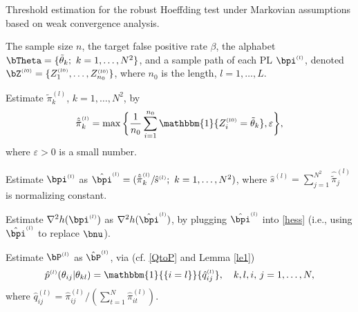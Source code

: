 \documentclass[10pt, twocolumn]{IEEEtran}
\begin{document}
\begin{algorithm}
  \caption{Threshold estimation for the robust Hoeffding test under
    Markovian assumptions based on weak convergence analysis.}
	\label{alg:thresrob1}
\begin{algorithmic}[1]
  \REQUIRE The sample size $n$, the target false positive
  rate $\beta$, the alphabet ${\bTheta} = \{
  {{{\tilde {\theta}}_k}}; ~k = 1, \ldots, N^2 \}$, and a sample path
  of each PL $\bpi^{\scriptscriptstyle{(l)}}$, denoted
  ${\bZ^{\scriptscriptstyle{( l0 )}}} = \{ {Z_1^{\scriptscriptstyle{( l0
        )}}, \ldots, Z_{n_0}^{\scriptscriptstyle{( l0 )}}}\}$, where
  $n_0$ is the length, $l=1,\ldots,L$.  


\STATE \label{line2} Estimate $ {{{\tilde
      {\pi}}_k^{\scriptscriptstyle{(l)}}}}$, $k=1,\ldots,N^2$, by
\[
{{\hat {\tilde {\pi}} }_k^{\scriptscriptstyle{(l)}}} = \max \bigg\{
\frac{1}{n_0} \sum_{i = 1}^{n_0} \mathbbm{1}\{
Z_i^{\scriptscriptstyle{(l0)}} = \tilde{\theta}_k \}, \varepsilon \bigg\},
\]
where $\varepsilon > 0$ is a small number. 

\STATE \label{line3} Estimate ${\bpi}^{\scriptscriptstyle{(l)}}$ as
${\hat{{\bpi}}^{\scriptscriptstyle{(l)}}} = ( {{{{{\hat{ \tilde
            {\pi}}}_k^{\scriptscriptstyle{(l)}}}}} \mathord{/ {\vphantom
      {1 2}} \kern-\nulldelimiterspace} {{\hat
      s^{\scriptscriptstyle{(l)}}}}}; ~k = 1, \ldots, N^2 )$, where
$\hat s^{\scriptscriptstyle{(l)}} = \sum\nolimits_{j = 1}^{{N^2}}
{{{\hat {\tilde{ \pi }}}_j^{\scriptscriptstyle{(l)}}}} $ is normalizing
constant.

\STATE Estimate ${\nabla^2}h( {\bpi}^{\scriptscriptstyle{(l)}} )$ as
${\nabla^2}h( \hat {{\bpi}}^{\scriptscriptstyle{(l)}} )$, by plugging
$\hat {{\bpi}}^{\scriptscriptstyle{(l)}}$ into \eqref{hess} (i.e., using
$\hat {{\bpi}}^{\scriptscriptstyle{(l)}}$ to replace ${\bnu}$).  

\STATE Estimate $\bP^{\scriptscriptstyle{(l)}}$ as $\hat
{\bP}^{\scriptscriptstyle{(l)}}$, via (cf. \eqref{QtoP} and Lemma
\ref{le1})
\[ {\hat p^{\scriptscriptstyle{(l)}}}( {{\theta_{ij}}| {{\theta_{kl}}} } ) =
\mathbbm{1}{\{ {i = l} \}}{{\hat q}_{ij}^{\scriptscriptstyle{(l)}}},
\quad k,l,i,\,j = 1, \ldots ,N, 
\]
where $ {{\hat q}_{ij}^{\scriptscriptstyle{(l)}}} = {\hat
  \pi}^{\scriptscriptstyle{(l)}}_{ij}/(\sum_{t = 1}^N {\hat
  \pi}^{\scriptscriptstyle{(l)}}_{it}).$ 


\end{algorithmic}
\end{algorithm}
\end{document}
